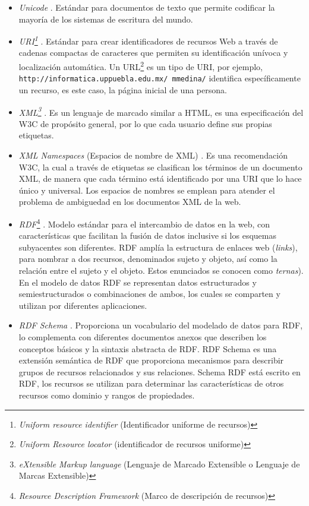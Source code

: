 \begin{itemize}
    \item \textit{Unicode} \cite{W3C}. Est\'andar para documentos de texto que permite codificar la mayor\'ia de los sistemas de escritura del mundo.
    
    \item \textit{URI\footnote{\textit{Uniform resource identifier} (Identificador uniforme de recursos)}} \cite{W3C}. Est\'andar para crear identificadores de recursos Web a trav\'es de cadenas compactas de caracteres que permiten su identificaci\'on un\'ivoca y localizaci\'on autom\'atica. Un URL\footnote{\textit{Uniform Resource locator} (identificador de recursos uniforme)} es un tipo de URI, por ejemplo, \texttt{http://informatica.uppuebla.edu.mx/~mmedina/} identifica espec\'ificamente un recurso, es este caso, la p\'agina inicial de una persona. 
    
    \item \textit{XML\footnote{\textit{eXtensible Markup language} (Lenguaje de Marcado Extensible o Lenguaje de Marcas Extensible)}} \cite{W3C}. Es un lenguaje de marcado similar a HTML, es una especificaci\'on del W3C de prop\'osito general, por lo que cada usuario define sus propias etiquetas. 
    
    \item \textit{XML Namespaces} (Espacios de nombre de XML) \cite{W3C}. Es una recomendaci\'on W3C, la cual a trav\'es de etiquetas se clasifican los t\'erminos de un documento XML, de manera que cada t\'ermino est\'a identificado por una URI que lo hace \'unico y universal. Los espacios de nombres se emplean para atender el problema de ambig\¨uedad en los documentos XML de la web.
    
    \item \textit{RDF}\footnote{\textit{Resource Description Framework} (Marco de descripci\'on de recursos)} \cite{W3C_SemanticWeb}. Modelo est\'andar para el intercambio de datos en la web, con caracter\'isticas que facilitan la fusi\'on de datos inclusive si los esquemas subyacentes son diferentes. RDF ampl\'ia la estructura de enlaces web (\emph{links}), para nombrar a dos recursos, denominados sujeto y objeto, as\'i como la relaci\'on entre el sujeto y el objeto. Estos enunciados se conocen como \textit{ternas}). En el modelo de datos RDF se representan datos estructurados y semiestructurados o combinaciones de ambos, los cuales se comparten y utilizan por diferentes aplicaciones.
    
    \item \textit{RDF Schema} \cite{W3C_RDFSchema}. Proporciona un vocabulario del modelado de datos para RDF, lo complementa con diferentes documentos anexos que describen los conceptos b\'asicos y la sintaxis abstracta de RDF. RDF Schema es una extensi\'on sem\'antica de RDF que proporciona mecanismos para describir grupos de recursos relacionados y sus relaciones. Schema RDF est\'a escrito en RDF, los recursos se utilizan para determinar las caracter\'isticas de otros recursos como dominio y rangos de propiedades.
    

\end{itemize}

